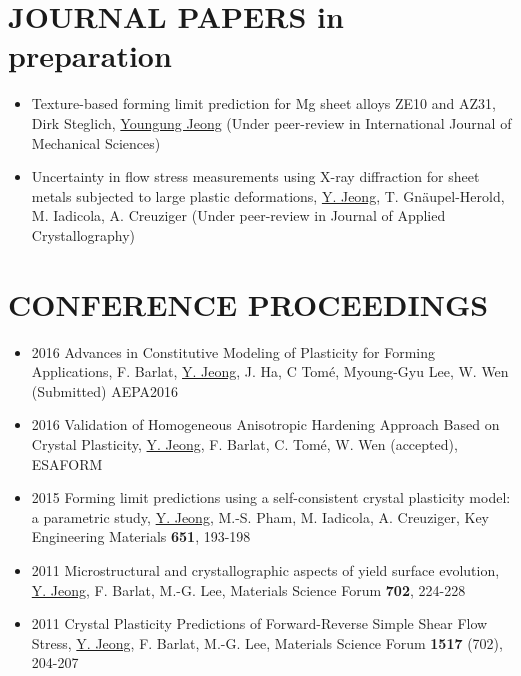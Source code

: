 \documentclass{res}
\begin{document}
\begin{resume}
  \section{JOURNAL PAPERS in preparation}
  \begin{itemize}
  \item Texture-based forming limit prediction for Mg sheet alloys ZE10 and AZ31, Dirk Steglich, \underline{Youngung Jeong} (Under peer-review in International Journal of Mechanical Sciences)
  \item Uncertainty in flow stress measurements using X-ray diffraction for sheet metals subjected to large plastic deformations, \underline{Y. Jeong}, T. Gn\"{a}upel-Herold, M. Iadicola, A. Creuziger (Under peer-review in Journal of Applied Crystallography)
  \end{itemize}

  \section{CONFERENCE PROCEEDINGS}
  \begin{itemize}
  \item 2016 Advances in Constitutive Modeling of Plasticity for Forming Applications, F. Barlat, \underline{Y. Jeong}, J. Ha, C Tom\'{e}, Myoung-Gyu Lee, W. Wen (Submitted) AEPA2016
  \item 2016 Validation of Homogeneous Anisotropic Hardening Approach Based on Crystal Plasticity, \underline{Y. Jeong}, F. Barlat, C. Tom\'{e}, W. Wen (accepted), ESAFORM
  \item 2015 Forming limit predictions using a self-consistent crystal plasticity model: a parametric study, \underline{Y. Jeong}, M.-S. Pham, M. Iadicola, A. Creuziger, Key Engineering Materials {\bf 651}, 193-198
  \item 2011 Microstructural and crystallographic aspects of yield surface evolution, \underline{Y. Jeong}, F. Barlat, M.-G. Lee,  Materials Science Forum {\bf 702}, 224-228
  \item 2011 Crystal Plasticity Predictions of Forward-Reverse Simple Shear Flow Stress, \underline{Y. Jeong}, F. Barlat, M.-G. Lee, Materials Science Forum {\bf 1517} (702), 204-207
  \end{itemize}


\end{resume}
\end{document}
